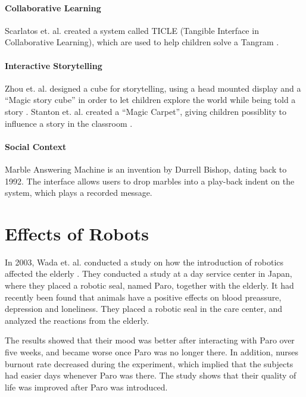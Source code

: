 \paragraph{Collaborative Learning}
Scarlatos et. al. created a system called TICLE (Tangible Interface in Collaborative Learning), which are used to help children solve a Tangram \cite{scarlatos1999ticle}.  

\paragraph{Interactive Storytelling}
Zhou et. al. designed a cube for storytelling, using a head mounted display and a ``Magic story cube'' in order to let children explore the world while being told a story \cite{zhou2004magic}. Stanton et. al. created a ``Magic Carpet'', giving children possiblity to influence a story in the classroom \cite{stanton2001classroom}. 
 
\paragraph{Social Context}
Marble Answering Machine is an invention by Durrell Bishop, dating back to 1992\cite{crampton1995hand}. The interface allows users to drop marbles into a play-back indent on the system, which plays a recorded message.   

\section{Effects of Robots}

In 2003, Wada et. al. conducted a study on how the introduction of robotics affected the elderly \cite{wada2004effects}. They conducted a study at a day service center in Japan, where they placed a robotic seal, named Paro, together with the elderly. It had recently been found that animals have a positive effects on blood preassure, depression and loneliness. They placed a robotic seal in the care center, and analyzed the reactions from the elderly. 

The results showed that their mood was better after interacting with Paro over five weeks, and became worse once Paro was no longer there. In addition, nurses burnout rate decreased during the experiment, which implied that the subjects had easier days whenever Paro was there. The study shows that their quality of life was improved after Paro was introduced.           


